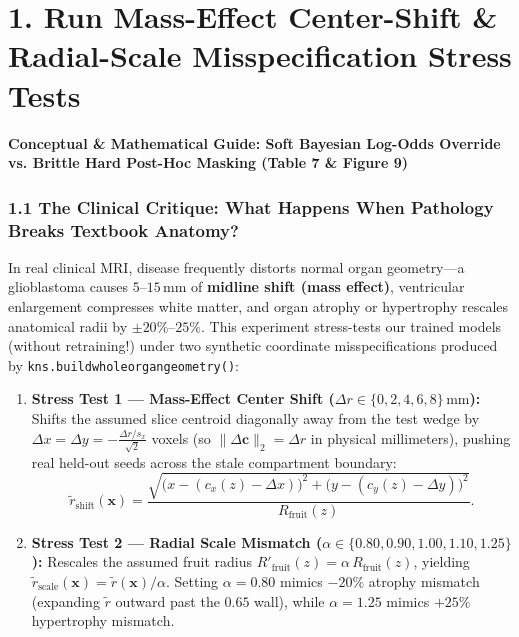 \documentclass[10pt,a4paper]{article}
\renewcommand{\_}{\origunderscore\allowbreak}
\begin{document}
\section*{1. Run Mass-Effect Center-Shift \& Radial-Scale Misspecification Stress Tests}

\begin{guidehdr}
{\small\bfseries\color{kiwigreen!75!black}Conceptual \& Mathematical Guide: Soft Bayesian Log-Odds Override vs. Brittle Hard Post-Hoc Masking (Table 7 \& Figure 9)}
\end{guidehdr}

\subsubsection*{1.1 The Clinical Critique: What Happens When Pathology Breaks Textbook Anatomy?}
In real clinical MRI, disease frequently distorts normal organ geometry---a glioblastoma causes $5$--$15\,\text{mm}$ of \textbf{midline shift (mass effect)}, ventricular enlargement compresses white matter, and organ atrophy or hypertrophy rescales anatomical radii by $\pm 20\%$--$25\%$. This experiment stress-tests our trained models (without retraining!) under two synthetic coordinate misspecifications produced by \texttt{kns.build\_whole\_organ\_geometry()}:

\begin{enumerate}
\item \textbf{Stress Test 1 --- Mass-Effect Center Shift ($\Delta r \in \{0, 2, 4, 6, 8\}\,\text{mm}$):} Shifts the assumed slice centroid diagonally away from the test wedge by $\Delta x = \Delta y = -\frac{\Delta r / s_x}{\sqrt{2}}$ voxels (so $\|\Delta \mathbf{c}\|_2 = \Delta r$ in physical millimeters), pushing real held-out seeds across the stale compartment boundary:
\[
\tilde{r}_{\text{shift}}(\mathbf{x}) = \frac{\sqrt{\bigl(x - (c_x(z) - \Delta x)\bigr)^2 + \bigl(y - (c_y(z) - \Delta y)\bigr)^2}}{R_{\text{fruit}}(z)}.
\]
\item \textbf{Stress Test 2 --- Radial Scale Mismatch ($\alpha \in \{0.80, 0.90, 1.00, 1.10, 1.25\}$):} Rescales the assumed fruit radius $R'_{\text{fruit}}(z) = \alpha\,R_{\text{fruit}}(z)$, yielding $\tilde{r}_{\text{scale}}(\mathbf{x}) = \tilde{r}(\mathbf{x}) / \alpha$. Setting $\alpha = 0.80$ mimics $-20\%$ atrophy mismatch (expanding $\tilde{r}$ outward past the $0.65$ wall), while $\alpha = 1.25$ mimics $+25\%$ hypertrophy mismatch.
\end{enumerate}
\end{document}
